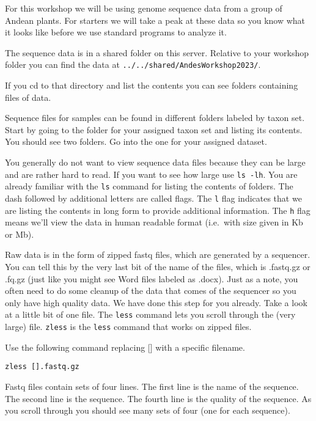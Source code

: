 \documentclass[
]{book}
\begin{document}
For this workshop we will be using genome sequence data from a group of Andean plants.
For starters we will take a peak at these data so you know what it looks like before we use standard programs to analyze it.

The sequence data is in a shared folder on this server.
Relative to your workshop folder you can find the data at
\texttt{../../shared/AndesWorkshop2023/}.

If you cd to that directory and list the contents you can see folders containing files of data.

Sequence files for samples can be found in different folders labeled by taxon set.
Start by going to the folder for your assigned taxon set and listing its contents.
You should see two folders.
Go into the one for your assigned dataset.

You generally do not want to view sequence data files because they can be large and are rather hard to read.
If you want to see how large use \texttt{ls\ -lh}.
You are already familiar with the \texttt{ls} command for listing the contents of folders.
The dash followed by additional letters are called flags.
The \texttt{l} flag indicates that we are listing the contents in long form to provide additional information.
The \texttt{h} flag means we'll view the data in human readable format (i.e.~with size given in Kb or Mb).

Raw data is in the form of zipped fastq files, which are generated by a sequencer.
You can tell this by the very last bit of the name of the files, which is .fastq.gz or .fq.gz (just like you might see Word files labeled as .docx).
Just as a note, you often need to do some cleanup of the data that comes of the sequencer
so you only have high quality data.
We have done this step for you already.
Take a look at a little bit of one file.
The \texttt{less} command lets you scroll through the (very large) file.
\texttt{zless} is the \texttt{less} command that works on zipped files.

Use the following command replacing {[}{]} with a specific filename.

\begin{verbatim}
zless [].fastq.gz
\end{verbatim}

Fastq files contain sets of four lines.
The first line is the name of the sequence.
The second line is the sequence.
The fourth line is the quality of the sequence.
As you scroll through you should see many sets of four (one for each sequence).
\end{document}
